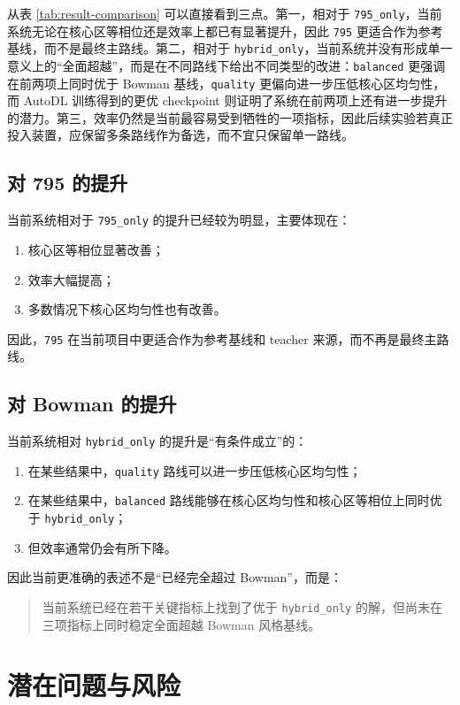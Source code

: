 \documentclass[12pt,a4paper]{ctexart}
\begin{document}
从表 \ref{tab:result-comparison} 可以直接看到三点。第一，相对于 \texttt{795\_only}，当前系统无论在核心区等相位还是效率上都已有显著提升，因此 \texttt{795} 更适合作为参考基线，而不是最终主路线。第二，相对于 \texttt{hybrid\_only}，当前系统并没有形成单一意义上的“全面超越”，而是在不同路线下给出不同类型的改进：\texttt{balanced} 更强调在前两项上同时优于 Bowman 基线，\texttt{quality} 更偏向进一步压低核心区均匀性，而 AutoDL 训练得到的更优 checkpoint 则证明了系统在前两项上还有进一步提升的潜力。第三，效率仍然是当前最容易受到牺牲的一项指标，因此后续实验若真正投入装置，应保留多条路线作为备选，而不宜只保留单一路线。

\subsection{对 795 的提升}
当前系统相对于 \texttt{795\_only} 的提升已经较为明显，主要体现在：
\begin{enumerate}[label=\arabic*.]
    \item 核心区等相位显著改善；
    \item 效率大幅提高；
    \item 多数情况下核心区均匀性也有改善。
\end{enumerate}

因此，\texttt{795} 在当前项目中更适合作为参考基线和 teacher 来源，而不再是最终主路线。

\subsection{对 Bowman 的提升}
当前系统相对 \texttt{hybrid\_only} 的提升是“有条件成立”的：
\begin{enumerate}[label=\arabic*.]
    \item 在某些结果中，\texttt{quality} 路线可以进一步压低核心区均匀性；
    \item 在某些结果中，\texttt{balanced} 路线能够在核心区均匀性和核心区等相位上同时优于 \texttt{hybrid\_only}；
    \item 但效率通常仍会有所下降。
\end{enumerate}

因此当前更准确的表述不是“已经完全超过 Bowman”，而是：
\begin{quote}
当前系统已经在若干关键指标上找到了优于 \texttt{hybrid\_only} 的解，但尚未在三项指标上同时稳定全面超越 Bowman 风格基线。
\end{quote}

\section{潜在问题与风险}
\end{document}
